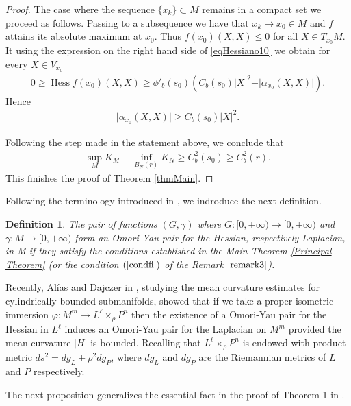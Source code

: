 \documentclass[a4paper]{amsart}
\newtheorem{definition}{Definition}
\begin{document}
\begin{proof}
The  case where the sequence $ \{x_k\} \subset M $ remains in a compact set we proceed as follows.  Passing to a subsequence we have that $ x_k \rightarrow x_0 \in M $ and $ f $ attains its absolute maximum at $ x_0 $. Thus $ f(x_0)(X,X) \leq 0 $ for all $ X \in T_{x_0}M $. It using the expression on the right hand side of \eqref{eqHessiano10} we obtain for every $ X \in V_{x_0} $
\begin{eqnarray*}
0 \geq \operatorname{Hess} f(x_0)(X,X) \geq \phi'_{b}(s_0)\left(C_{b}(s_0)\vert X\vert ^{2} - \vert \alpha_{x_0}(X,X)\vert\right) .
\end{eqnarray*}
Hence
\begin{eqnarray*}
\vert \alpha_{x_0}(X,X)\vert  \geq C_{b}(s_0)\vert X\vert^2 .
\end{eqnarray*}

Following the step made in the statement above, we conclude that
\begin{eqnarray}
\sup_{M}K_{M} - \inf_{B_{N}(r)}K_{N} \geq C_{b}^{2}(s_0) \geq C_{b}^{2}(r) .
\end{eqnarray}
This finishes the proof of Theorem \ref{thmMain}.
\end{proof}

Following the terminology introduced in \cite{alias-bessa-montenegro-piccione}, we indroduce the next definition.

\begin{definition}
The pair of functions $ (G,\gamma) $ where $ G : [0,+\infty) \rightarrow [0,+\infty) $ and \linebreak 
$ \gamma : M \rightarrow [0,+\infty) $ form an Omori-Yau pair for the Hessian, respectively Laplacian, in M if they satisfy the conditions established in the Main Theorem \ref{Principal Theorem} (or the condition $(\ref{condfi})$ of the Remark $\ref{remark3}$).
\end{definition}
Recently, Al\'ias and  Dajczer in \cite{alias-dajczer}, studying the mean curvature estimates for cylindrically bounded submanifolds, showed that if we take a proper isometric immersion $ \varphi : M^{m} \rightarrow L^{\ell}\times_{\rho}P^n $  then the existence of a Omori-Yau pair for the Hessian in $ L^\ell $ induces an Omori-Yau pair for the Laplacian on $M^{m}$ provided the mean curvature  $ \vert H \vert $ is bounded. Recalling that $ L^{\ell}\times_{\rho}P^n $ is endowed with product metric $ ds^{2} = dg_{L} + \rho^{2}dg_{P} $, where $ dg_{L} $ and $ dg_{P} $ are the Riemannian metrics of $ L $ and $ P $ respectively.

The next proposition generalizes the essential fact in the proof of Theorem 1 in \cite{alias-dajczer}.
\end{document}
